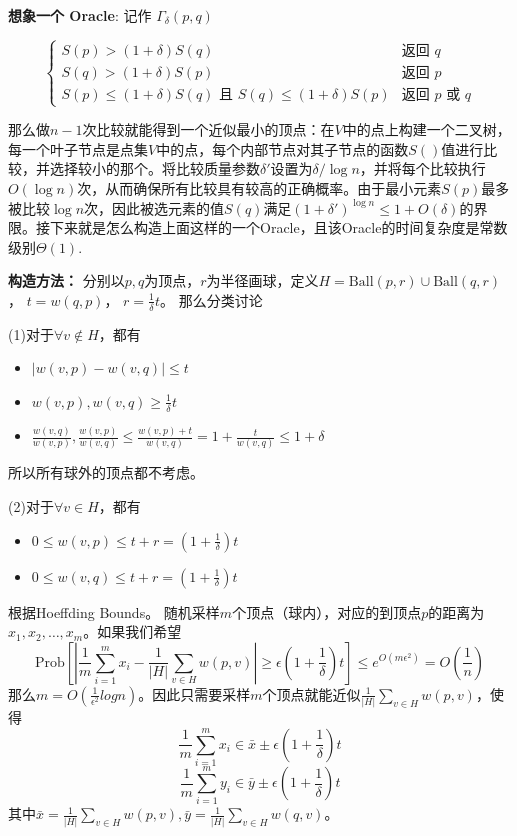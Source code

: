 \documentclass[lang=cn,newtx,10pt,scheme=chinese,chinesefont=nofont,citestyle=gb7714-2015, bibstyle=gb7714-2015]{elegantbook}
\begin{document}
\begin{refsection}
\textbf{想象一个 Oracle}: 记作 \( \Gamma_\delta(p, q) \)

\[
\begin{cases}
    S(p) > (1+\delta) S(q) & \text{返回 } q \\
    S(q) > (1+\delta) S(p) & \text{返回 } p \\
    S(p) \leq (1+\delta) S(q) \text{ 且 } S(q) \leq (1+\delta) S(p) & \text{返回 } p \text{ 或 } q
\end{cases}
\]

那么做$n-1$次比较就能得到一个近似最小的顶点：在$V$中的点上构建一个二叉树，每一个叶子节点是点集$V$中的点，每个内部节点对其子节点的函数$S()$值进行比较，并选择较小的那个。将比较质量参数$\delta'$设置为$\delta / \log n$，并将每个比较执行$O(\log n)$次，从而确保所有比较具有较高的正确概率。由于最小元素$S(p)$最多被比较$\log n$次，因此被选元素的值$S(q)$满足$(1 + \delta')^{\log n} \leq 1 + O(\delta)$的界限。接下来就是怎么构造上面这样的一个Oracle，且该Oracle的时间复杂度是常数级别$\Theta(1)$.

\textbf{构造方法：}
分别以$p,q$为顶点，$r$为半径画球，定义$H = \text{Ball}(p, r) \cup \text{Ball}(q, r)$， $t = w(q, p)$， $r = \frac{1}{\delta} t$。 那么分类讨论

(1)对于$\forall v \notin H$，都有\begin{itemize}
    \item $|w(v, p) - w(v, q)| \leq t$
    \item $w(v, p),  w(v, q) \geq \frac{1}{\delta} t$
    \item $\frac{w(v, q)}{w(v, p)}, \frac{w(v, p)}{w(v, q)} \leq \frac{w(v, p) + t}{w(v, q)}= 1 + \frac{t}{w(v, q)} \leq 1 + \delta$
\end{itemize}
所以所有球外的顶点都不考虑。

(2)对于$\forall v \in H$，都有\begin{itemize}
    \item $0 \leq w(v, p) \leq t+r =(1+\frac{1}{\delta})t $
    \item $0 \leq w(v, q) \leq t+r =(1+\frac{1}{\delta})t $
\end{itemize}
根据Hoeffding Bounds。 随机采样$m$个顶点（球内），对应的到顶点$p$的距离为$x_1, x_2, \dots, x_m$。如果我们希望
\begin{equation*}
    \text{Prob}[|\frac{1}{m}\sum_{i=1}^{m}x_{i}- \frac{1}{|H|}\sum_{v\in H}w(p,v)| \geq \epsilon(1+\frac{1}{\delta})t]\leq e^{O(m\epsilon^{2})}=O(\frac{1}{n})
\end{equation*}
那么$m = O(\frac{1}{\epsilon^2}logn)$。因此只需要采样$m$个顶点就能近似$\frac{1}{|H|}\sum_{v\in H}w(p,v)$，使得
\begin{equation*}
    \frac{1}{m}\sum_{i=1}^{m}x_{i} \in \bar{x} \pm \epsilon (1+\frac{1}{\delta})t
\end{equation*}
\begin{equation*}
    \frac{1}{m}\sum_{i=1}^{m}y_{i} \in \bar{y} \pm \epsilon (1+\frac{1}{\delta})t
\end{equation*}
其中$\bar{x} = \frac{1}{|H|}\sum_{v\in H}w(p,v), \bar{y} = \frac{1}{|H|}\sum_{v\in H}w(q,v)$。 


\end{refsection}
\end{document}
